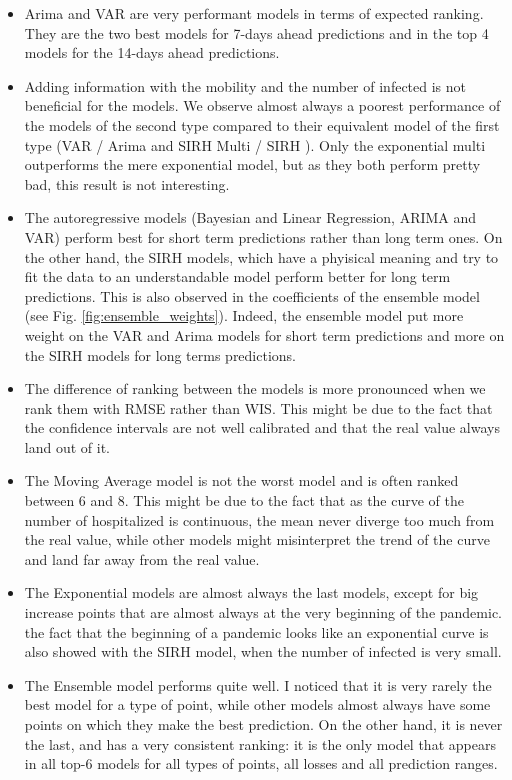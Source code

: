 \begin{itemize}
    \item Arima and VAR are very performant models in terms of expected ranking. They are the two best models for 7-days ahead predictions and in the top 4 models for the 14-days ahead predictions. 
    \item Adding information with the mobility and the number of infected is not beneficial for the models. We observe almost always a poorest performance of the models of the second type compared to their equivalent model of the first type (VAR / Arima and SIRH Multi / SIRH ). Only the exponential multi outperforms the mere exponential model, but as they both perform pretty bad, this result is not interesting. 
    \item The autoregressive models (Bayesian and Linear Regression, ARIMA and VAR) perform best for short term predictions rather than long term ones. On the other hand, the SIRH models, which have a phyisical meaning and try to fit the data to an understandable model perform better for long term predictions. This is also observed in the coefficients of the ensemble model (see Fig. \ref{fig:ensemble_weights}). Indeed, the ensemble model put more weight on the VAR and Arima models for short term predictions and more on the SIRH models for long terms predictions.  
    \item The difference of ranking between the models is more pronounced when we rank them with RMSE rather than WIS. This might be due to the fact that the confidence intervals are not well calibrated and that the real value always land out of it. 
    \item The Moving Average model is not the worst model and is often ranked between 6 and 8. This might be due to the fact that as the curve of the number of hospitalized is continuous, the mean never diverge too much from the real value, while other models might misinterpret the trend of the curve and land far away from the real value. 
    \item The Exponential models are almost always the last models, except for big increase points that are almost always at the very beginning of the pandemic. the fact that the beginning of a pandemic looks like an exponential curve is also showed with the SIRH model, when the number of infected is very small. 
    \item The Ensemble model performs quite well. I noticed that it is very rarely the best model for a type of point, while other models almost always have some points on which they make the best prediction. On the other hand, it is never the last, and has a very consistent ranking: it is the only model that appears in all top-6 models for all types of points, all losses and all prediction ranges.
\end{itemize}



